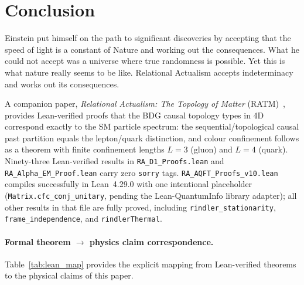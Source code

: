 \documentclass[11pt,a4paper]{article}
\theoremstyle{plain}
\theoremstyle{definition}
\theoremstyle{remark}
\begin{document}
\section{Conclusion}
\label{sec:conclusion}

Einstein put himself on the path to significant discoveries by accepting that the
speed of light is a constant of Nature and working out the consequences. What he
could not accept was a universe where true randomness is possible. Yet this is what
nature really seems to be like. Relational Actualism accepts indeterminacy and
works out its consequences.

A companion paper, \emph{Relational Actualism: The Topology of Matter}
(RATM)~\citep{Sandeman2026RATM}, provides Lean-verified proofs that the
BDG causal topology types in 4D correspond exactly to the SM particle
spectrum: the sequential/topological causal past partition equals the
lepton/quark distinction, and colour confinement follows as a theorem
with finite confinement lengths $L=3$ (gluon) and $L=4$ (quark).
Ninety-three Lean-verified results in \texttt{RA\_D1\_Proofs.lean}
and \texttt{RA\_Alpha\_EM\_Proof.lean} carry zero \texttt{sorry} tags.
\texttt{RA\_AQFT\_Proofs\_v10.lean} compiles successfully in Lean~4.29.0
with one intentional placeholder (\texttt{Matrix.cfc\_conj\_unitary},
pending the Lean-QuantumInfo library adapter); all other results in that
file are fully proved, including \texttt{rindler\_stationarity},
\texttt{frame\_independence}, and \texttt{rindlerThermal}.





\paragraph{Formal theorem $\to$ physics claim correspondence.}
Table~\ref{tab:lean_map} provides the explicit mapping from Lean-verified
theorems to the physical claims of this paper.
\end{document}
